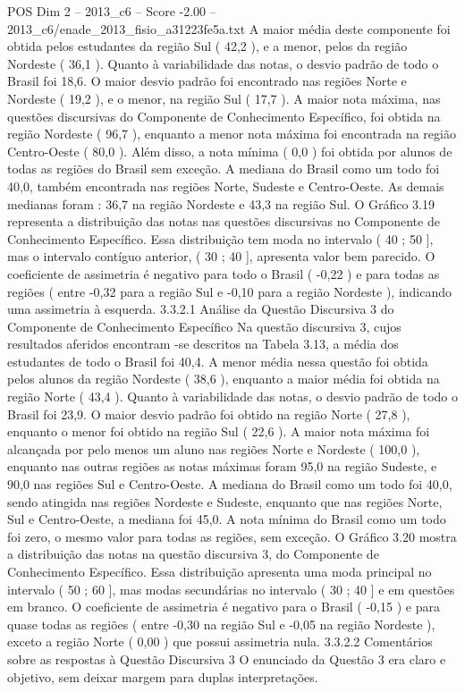 \begin{textsample}{POS Dim 2 – 2013\_c6 – Score -2.00 – 2013\_c6/enade\_2013\_fisio\_a31223fe5a.txt}
A maior média deste componente foi obtida pelos estudantes da região Sul ( 42,2 ), e a menor, pelos da região Nordeste ( 36,1 ).
Quanto à variabilidade das notas, o desvio padrão de todo o Brasil foi 18,6.
O maior desvio padrão foi encontrado nas regiões Norte e Nordeste ( 19,2 ), e o menor, na região Sul ( 17,7 ).
A maior nota máxima, nas questões discursivas do Componente de Conhecimento Específico, foi obtida na região Nordeste ( 96,7 ), enquanto a menor nota máxima foi encontrada na região Centro-Oeste ( 80,0 ).
Além disso, a nota mínima ( 0,0 ) foi obtida por alunos de todas as regiões do Brasil sem exceção.
A mediana do Brasil como um todo foi 40,0, também encontrada nas regiões Norte, Sudeste e Centro-Oeste.
As demais medianas foram : 36,7 na região Nordeste e 43,3 na região Sul.
O Gráfico 3.19 representa a distribuição das notas nas questões discursivas no Componente de Conhecimento Específico.
Essa distribuição tem moda no intervalo ( 40 ; 50 ], mas o intervalo contíguo anterior, ( 30 ; 40 ], apresenta valor bem parecido.
O coeficiente de assimetria é negativo para todo o Brasil ( -0,22 ) e para todas as regiões ( entre -0,32 para a região Sul e -0,10 para a região Nordeste ), indicando uma assimetria à esquerda. 3.3.2.1 Análise da Questão Discursiva 3 do Componente de Conhecimento Específico Na questão discursiva 3, cujos resultados aferidos encontram -se descritos na Tabela 3.13, a média dos estudantes de todo o Brasil foi 40,4.
A menor média nessa questão foi obtida pelos alunos da região Nordeste ( 38,6 ), enquanto a maior média foi obtida na região Norte ( 43,4 ).
Quanto à variabilidade das notas, o desvio padrão de todo o Brasil foi 23,9.
O maior desvio padrão foi obtido na região Norte ( 27,8 ), enquanto o menor foi obtido na região Sul ( 22,6 ).
A maior nota máxima foi alcançada por pelo menos um aluno nas regiões Norte e Nordeste ( 100,0 ), enquanto nas outras regiões as notas máximas foram 95,0 na região Sudeste, e 90,0 nas regiões Sul e Centro-Oeste.
A mediana do Brasil como um todo foi 40,0, sendo atingida nas regiões Nordeste e Sudeste, enquanto que nas regiões Norte, Sul e Centro-Oeste, a mediana foi 45,0.
A nota mínima do Brasil como um todo foi zero, o mesmo valor para todas as regiões, sem exceção.
O Gráfico 3.20 mostra a distribuição das notas na questão discursiva 3, do Componente de Conhecimento Específico.
Essa distribuição apresenta uma moda principal no intervalo ( 50 ; 60 ], mas modas secundárias no intervalo ( 30 ; 40 ] e em questões em branco.
O coeficiente de assimetria é negativo para o Brasil ( -0,15 ) e para quase todas as regiões ( entre -0,30 na região Sul e -0,05 na região Nordeste ), exceto a região Norte ( 0,00 ) que possui assimetria nula. 3.3.2.2 Comentários sobre as respostas à Questão Discursiva 3 O enunciado da Questão 3 era claro e objetivo, sem deixar margem para duplas interpretações.

\end{textsample}
